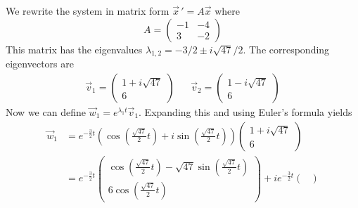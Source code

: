 \documentclass[11pt, titlepage]{article}
\begin{document}
  \begin{solution}
    We rewrite the system in matrix form \(\vec{x} \,' = A \vec{x}\) where
    \begin{equation*}
      A =
      \begin{pmatrix}
        -1 & -4 \\
        3 & -2
      \end{pmatrix}
    \end{equation*}
    This matrix has the eigenvalues \(\lambda_{1, 2} = -3 / 2 \pm i \sqrt{47} / 2\).
    The corresponding eigenvectors are
    \begin{align*}
      \vec{v}_{1} =
      \begin{pmatrix}
        1 + i \sqrt{47} \\
        6
      \end{pmatrix}
      &&
      \vec{v}_{2} =
      \begin{pmatrix}
        1 - i \sqrt{47} \\
        6
      \end{pmatrix}
    \end{align*}
    Now we can define \(\vec{w}_{1} = e^{\lambda_{1}t} \vec{v}_{1}\). Expanding this and using Euler's formula yields
    \begin{align*}
      \vec{w}_{1}
      &= e^{-\frac{3}{2}t} \left( \cos \left(\frac{\sqrt{47}}{2}t \right) + i \sin \left( \frac{\sqrt{47}}{2}t \right)\right)
      \begin{pmatrix}
        1 + i \sqrt{47} \\
        6
      \end{pmatrix} \\
      &= e^{-\frac{3}{2}t}
      \begin{pmatrix}
        \cos(\frac{\sqrt{47}}{2} t) - \sqrt{47} \sin(\frac{\sqrt{47}}{2} t) \\
        6 \cos(\frac{\sqrt{47}}{2} t)
      \end{pmatrix}
      + i e^{-\frac{3}{2} t}
      \begin{pmatrix}

\end{pmatrix}
\end{align*}
\end{solution}
\end{document}

